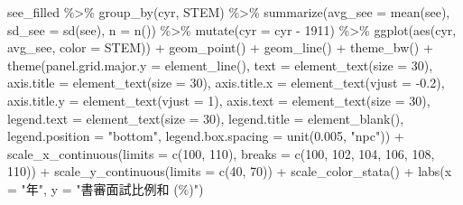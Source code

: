 \documentclass[
]{article}
\newenvironment{Shaded}{\begin{snugshade}}{\end{snugshade}}
\newcommand{\AttributeTok}[1]{\textcolor[rgb]{0.77,0.63,0.00}{#1}}
\newcommand{\DecValTok}[1]{\textcolor[rgb]{0.00,0.00,0.81}{#1}}
\newcommand{\FloatTok}[1]{\textcolor[rgb]{0.00,0.00,0.81}{#1}}
\newcommand{\FunctionTok}[1]{\textcolor[rgb]{0.00,0.00,0.00}{#1}}
\newcommand{\NormalTok}[1]{#1}
\newcommand{\SpecialCharTok}[1]{\textcolor[rgb]{0.00,0.00,0.00}{#1}}
\newcommand{\StringTok}[1]{\textcolor[rgb]{0.31,0.60,0.02}{#1}}
\begin{document}
\begin{Shaded}
\begin{Highlighting}[]
\NormalTok{see\_filled }\SpecialCharTok{\%\textgreater{}\%}
  \FunctionTok{group\_by}\NormalTok{(cyr, STEM) }\SpecialCharTok{\%\textgreater{}\%}
  \FunctionTok{summarize}\NormalTok{(}\AttributeTok{avg\_see =} \FunctionTok{mean}\NormalTok{(see),}
            \AttributeTok{sd\_see =} \FunctionTok{sd}\NormalTok{(see),}
            \AttributeTok{n =} \FunctionTok{n}\NormalTok{()) }\SpecialCharTok{\%\textgreater{}\%}
  \FunctionTok{mutate}\NormalTok{(}\AttributeTok{cyr =}\NormalTok{ cyr }\SpecialCharTok{{-}} \DecValTok{1911}\NormalTok{) }\SpecialCharTok{\%\textgreater{}\%}
  \FunctionTok{ggplot}\NormalTok{(}\FunctionTok{aes}\NormalTok{(cyr, avg\_see, }\AttributeTok{color =}\NormalTok{ STEM)) }\SpecialCharTok{+}
  \FunctionTok{geom\_point}\NormalTok{() }\SpecialCharTok{+}
  \FunctionTok{geom\_line}\NormalTok{() }\SpecialCharTok{+}
  \FunctionTok{theme\_bw}\NormalTok{() }\SpecialCharTok{+}
  \FunctionTok{theme}\NormalTok{(}\AttributeTok{panel.grid.major.y =} \FunctionTok{element\_line}\NormalTok{(), }
        \AttributeTok{text =} \FunctionTok{element\_text}\NormalTok{(}\AttributeTok{size =} \DecValTok{30}\NormalTok{), }
        \AttributeTok{axis.title =} \FunctionTok{element\_text}\NormalTok{(}\AttributeTok{size =} \DecValTok{30}\NormalTok{),}
        \AttributeTok{axis.title.x =} \FunctionTok{element\_text}\NormalTok{(}\AttributeTok{vjust =} \SpecialCharTok{{-}}\FloatTok{0.2}\NormalTok{),}
        \AttributeTok{axis.title.y =} \FunctionTok{element\_text}\NormalTok{(}\AttributeTok{vjust =} \DecValTok{1}\NormalTok{),}
        \AttributeTok{axis.text =} \FunctionTok{element\_text}\NormalTok{(}\AttributeTok{size =} \DecValTok{30}\NormalTok{),}
        \AttributeTok{legend.text =} \FunctionTok{element\_text}\NormalTok{(}\AttributeTok{size =} \DecValTok{30}\NormalTok{),}
        \AttributeTok{legend.title =} \FunctionTok{element\_blank}\NormalTok{(),}
        \AttributeTok{legend.position =} \StringTok{"bottom"}\NormalTok{,}
        \AttributeTok{legend.box.spacing =} \FunctionTok{unit}\NormalTok{(}\FloatTok{0.005}\NormalTok{, }\StringTok{"npc"}\NormalTok{)) }\SpecialCharTok{+}
  \FunctionTok{scale\_x\_continuous}\NormalTok{(}\AttributeTok{limits =} \FunctionTok{c}\NormalTok{(}\DecValTok{100}\NormalTok{, }\DecValTok{110}\NormalTok{), }\AttributeTok{breaks =} \FunctionTok{c}\NormalTok{(}\DecValTok{100}\NormalTok{, }\DecValTok{102}\NormalTok{, }\DecValTok{104}\NormalTok{, }\DecValTok{106}\NormalTok{, }\DecValTok{108}\NormalTok{, }\DecValTok{110}\NormalTok{)) }\SpecialCharTok{+}
  \FunctionTok{scale\_y\_continuous}\NormalTok{(}\AttributeTok{limits =} \FunctionTok{c}\NormalTok{(}\DecValTok{40}\NormalTok{, }\DecValTok{70}\NormalTok{)) }\SpecialCharTok{+}
  \FunctionTok{scale\_color\_stata}\NormalTok{() }\SpecialCharTok{+}
  \FunctionTok{labs}\NormalTok{(}\AttributeTok{x =} \StringTok{"年"}\NormalTok{, }\AttributeTok{y =} \StringTok{"書審面試比例和 (\%)"}\NormalTok{)}
\end{Highlighting}
\end{Shaded}
\end{document}
